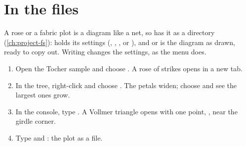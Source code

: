 \section{In the files}

A rose or a fabric plot is a diagram like a net, so  has it as a directory
(\cref{ch:project-fs}):  holds its settings
(, , , or ), and
 or  is the diagram as drawn, ready to
copy out. Writing  changes the settings, as the menu does.

\begin{tryit}
\begin{enumerate}
\item Open the Tocher sample and choose . A rose of strikes opens in a new
tab.
\item In the tree, right-click  and choose . The petals widen; choose
 and see the largest ones grow.
\item In the console, type . A Vollmer triangle opens with one point, ,
near the girdle corner.
\item Type  and : the plot as a
file.
\end{enumerate}
\end{tryit}
